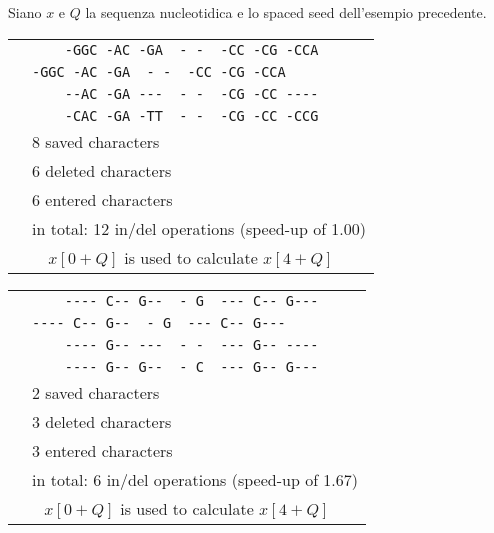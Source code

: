 \begin{example}
	Siano $x$ e $Q$ la sequenza nucleotidica e lo spaced seed dell'esempio precedente. 
	
	\begin{center}
		\begin{tabular}{c | l}
			\multirow{8}{*}{\rotatebox[origin=c]{90}{$\texttt{one\_to\_keep}_0$}}
			& \verb|    -GGC -AC -GA  - -  -CC -CG -CCA| \\
			& \verb|-GGC -AC -GA  - -  -CC -CG -CCA    | \\
			& \verb|    --AC -GA ---  - -  -CG -CC ----| \\
			& \verb|    -CAC -GA -TT  - -  -CG -CC -CCG| \\
			\cline{2-2}
			& 8 saved characters \\
			& 6 deleted characters \\
			& 6 entered characters \\
			\cline{2-2}
			& in total: 12 in/del operations (speed-up of 1.00) \\
			\bottomrule
			\multicolumn{2}{c}{$x[0 + Q]$ is used to calculate $x[4 + Q]$} \\
		\end{tabular}
	\end{center}
	
	\begin{center}
		\begin{tabular}{c | l}
			\multirow{8}{*}{\rotatebox[origin=c]{90}{$\texttt{one\_to\_keep}_1$}}
			& \verb|    ---- C-- G--  - G  --- C-- G---| \\
			& \verb|---- C-- G--  - G  --- C-- G---    | \\
			& \verb|    ---- G-- ---  - -  --- G-- ----| \\
			& \verb|    ---- G-- G--  - C  --- G-- G---| \\
			\cline{2-2}
			& 2 saved characters \\
			& 3 deleted characters \\
			& 3 entered characters \\
			\cline{2-2}
			& in total: 6 in/del operations (speed-up of 1.67) \\
			\bottomrule
			\multicolumn{2}{c}{$x[0 + Q]$ is used to calculate $x[4 + Q]$} \\
		\end{tabular}
	\end{center}
	

\end{example}
